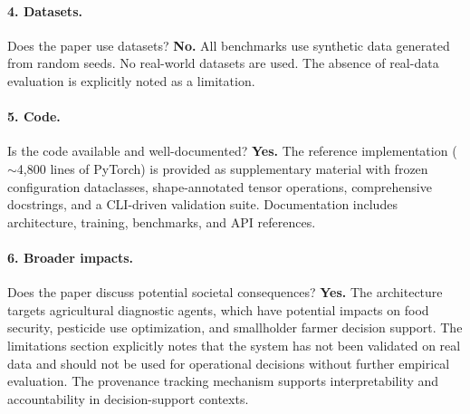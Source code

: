 \documentclass{article}
\begin{document}
\paragraph{4. Datasets.}
Does the paper use datasets?
\textbf{No.} All benchmarks use synthetic data generated from random seeds.
No real-world datasets are used. The absence of real-data evaluation is
explicitly noted as a limitation.

\paragraph{5. Code.}
Is the code available and well-documented?
\textbf{Yes.} The reference implementation ($\sim$4,800 lines of PyTorch) is
provided as supplementary material with frozen configuration dataclasses,
shape-annotated tensor operations, comprehensive docstrings, and a CLI-driven
validation suite. Documentation includes architecture, training, benchmarks,
and API references.

\paragraph{6. Broader impacts.}
Does the paper discuss potential societal consequences?
\textbf{Yes.} The architecture targets agricultural diagnostic agents, which
have potential impacts on food security, pesticide use optimization, and
smallholder farmer decision support. The limitations section explicitly notes
that the system has not been validated on real data and should not be used for
operational decisions without further empirical evaluation. The provenance
tracking mechanism supports interpretability and accountability in
decision-support contexts.
\end{document}
